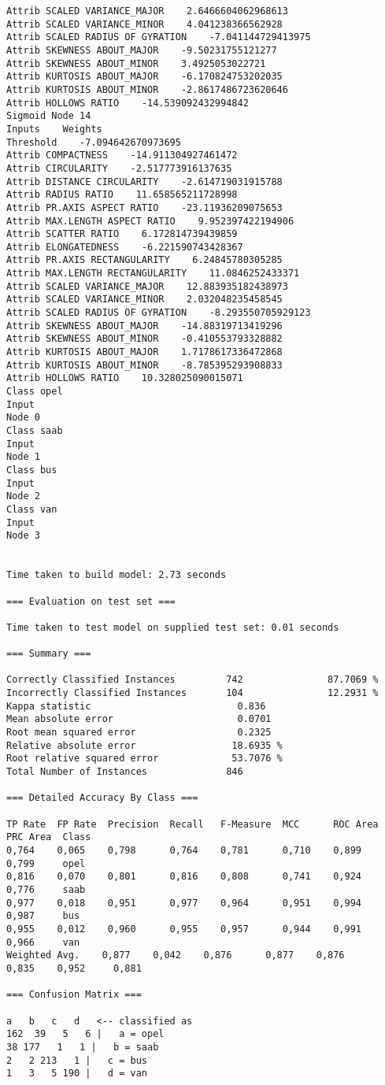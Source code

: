 \documentclass[
	article,			%
	11pt,				%
	oneside,			%
	a4paper,			%
	english,			%
	brazil,				%
	sumario=tradicional
	]{abntex2}
\begin{document}
\begin{lstlisting}
Attrib SCALED VARIANCE_MAJOR    2.6466604062968613
Attrib SCALED VARIANCE_MINOR    4.041238366562928
Attrib SCALED RADIUS OF GYRATION    -7.041144729413975
Attrib SKEWNESS ABOUT_MAJOR    -9.50231755121277
Attrib SKEWNESS ABOUT_MINOR    3.4925053022721
Attrib KURTOSIS ABOUT_MAJOR    -6.170824753202035
Attrib KURTOSIS ABOUT_MINOR    -2.8617486723620646
Attrib HOLLOWS RATIO    -14.539092432994842
Sigmoid Node 14
Inputs    Weights
Threshold    -7.094642670973695
Attrib COMPACTNESS    -14.911304927461472
Attrib CIRCULARITY    -2.517773916137635
Attrib DISTANCE CIRCULARITY    -2.614719031915788
Attrib RADIUS RATIO    11.658565211728998
Attrib PR.AXIS ASPECT RATIO    -23.11936209075653
Attrib MAX.LENGTH ASPECT RATIO    9.952397422194906
Attrib SCATTER RATIO    6.172814739439859
Attrib ELONGATEDNESS    -6.221590743428367
Attrib PR.AXIS RECTANGULARITY    6.24845780305285
Attrib MAX.LENGTH RECTANGULARITY    11.0846252433371
Attrib SCALED VARIANCE_MAJOR    12.883935182438973
Attrib SCALED VARIANCE_MINOR    2.032048235458545
Attrib SCALED RADIUS OF GYRATION    -8.293550705929123
Attrib SKEWNESS ABOUT_MAJOR    -14.88319713419296
Attrib SKEWNESS ABOUT_MINOR    -0.410553793328882
Attrib KURTOSIS ABOUT_MAJOR    1.7178617336472868
Attrib KURTOSIS ABOUT_MINOR    -8.785395293908833
Attrib HOLLOWS RATIO    10.328025090015071
Class opel
Input
Node 0
Class saab
Input
Node 1
Class bus
Input
Node 2
Class van
Input
Node 3


Time taken to build model: 2.73 seconds

=== Evaluation on test set ===

Time taken to test model on supplied test set: 0.01 seconds

=== Summary ===

Correctly Classified Instances         742               87.7069 %
Incorrectly Classified Instances       104               12.2931 %
Kappa statistic                          0.836 
Mean absolute error                      0.0701
Root mean squared error                  0.2325
Relative absolute error                 18.6935 %
Root relative squared error             53.7076 %
Total Number of Instances              846     

=== Detailed Accuracy By Class ===

TP Rate  FP Rate  Precision  Recall   F-Measure  MCC      ROC Area  PRC Area  Class
0,764    0,065    0,798      0,764    0,781      0,710    0,899     0,799     opel
0,816    0,070    0,801      0,816    0,808      0,741    0,924     0,776     saab
0,977    0,018    0,951      0,977    0,964      0,951    0,994     0,987     bus
0,955    0,012    0,960      0,955    0,957      0,944    0,991     0,966     van
Weighted Avg.    0,877    0,042    0,876      0,877    0,876      0,835    0,952     0,881     

=== Confusion Matrix ===

a   b   c   d   <-- classified as
162  39   5   6 |   a = opel
38 177   1   1 |   b = saab
2   2 213   1 |   c = bus
1   3   5 190 |   d = van



\end{lstlisting}
\end{document}
